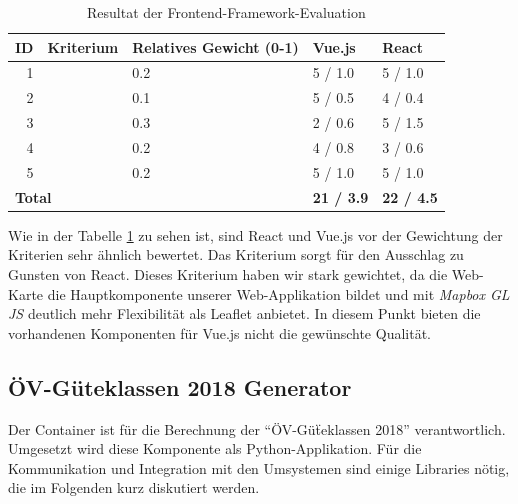 \begin{table}[ht]
    \centering
    \begin{tabular}{r l p{3cm} l l}
        \toprule
        \textbf{ID} &
        \textbf{Kriterium} &
        \textbf{Relatives Gewicht (0-1)} &
        \textbf{Vue.js} &
        \textbf{React} \\
        \midrule
        1     & \nameref{Analyse Framework:Funktionsumfang}           & 0.2           & 5 / 1.0   & 5 / 1.0  \\
        2     & \nameref{Analyse Framework:Integration Leaflet}       & 0.1           & 5 / 0.5   & 4 / 0.4  \\
        3     & \nameref{Analyse Framework:Integration Vector Tiles}  & 0.3           & 2 / 0.6   & 5 / 1.5  \\
        4     & \nameref{Analyse Framework:Lernkurve}                 & 0.2           & 4 / 0.8   & 3 / 0.6  \\
        5     & \nameref{Analyse Framework:Tooling}                   & 0.2           & 5 / 1.0   & 5 / 1.0  \\
        \bottomrule
        \multicolumn{3}{l}{\textbf{Total}}                                            & \textbf{21 / 3.9}
                                                                                                & \textbf{22 / 4.5} \\
    \end{tabular}
    \caption{Resultat der Frontend-Framework-Evaluation}
    \label{table:Resultat der Frontend-Framework-Evaluation}
\end{table}

Wie in der Tabelle \ref{table:Resultat der Frontend-Framework-Evaluation} zu sehen ist, sind React und Vue.js vor der Gewichtung der Kriterien sehr ähnlich bewertet.
Das Kriterium  sorgt für den Ausschlag zu Gunsten von React.
Dieses Kriterium haben wir stark gewichtet, da die Web-Karte die Hauptkomponente unserer Web-Applikation bildet und mit \emph{Mapbox GL JS} deutlich mehr Flexibilität als Leaflet anbietet.
In diesem Punkt bieten die vorhandenen Komponenten für Vue.js nicht die gewünschte Qualität.

\subsection{ÖV-Güteklassen 2018 Generator}
\label{Analyse:ÖV-Güteklassen 2018 Generator}

Der  Container ist für die Berechnung der "`ÖV-Güẗeklassen 2018"' verantwortlich.
Umgesetzt wird diese Komponente als Python-Applikation.
Für die Kommunikation und Integration mit den Umsystemen sind einige Libraries nötig, die im Folgenden kurz diskutiert werden.

